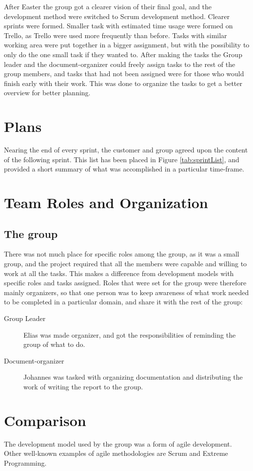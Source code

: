 After Easter the group got a clearer vision of their final goal, and the development method were switched to Scrum development method. Clearer sprints were formed. Smaller task with estimated time usage were formed on Trello, as Trello were used more frequently than before. Tasks with similar working area were put together in a bigger assignment, but with the possibility to only do the one small task if they wanted to. After making the tasks the Group leader and the document-organizer could freely assign tasks to the rest of the group members, and tasks that had not been assigned were for those who would finish early with their work. This was done to organize the tasks to get a better overview for better planning.


\section{Plans}

Nearing the end of every sprint, the customer and group agreed upon the content of the following sprint. This list has been placed in Figure \ref{tab:sprintList}, and provided a short summary of what was accomplished in a particular time-frame. 


\section{Team Roles and Organization}
\subsection{The group}
There was not much place for specific roles among the group, as it was a small group, and the project required that all the members were capable and willing to work at all the tasks. This makes a difference from development models with specific roles and tasks assigned. Roles that were set for the group were therefore mainly organizers, so that one person was to keep awareness of what work needed to be completed in a particular domain, and share it with the rest of the group:

\begin{description}

\item[Group Leader] Elias was made organizer, and got the responsibilities of reminding the group of what to do.
\item[Document-organizer] Johannes was tasked with organizing documentation and distributing the work of writing the report to the group. 
\end{description}

\section{Comparison}
The development model used by the group was a form of agile development. Other well-known examples of agile methodologies are Scrum and Extreme Programming.
 

